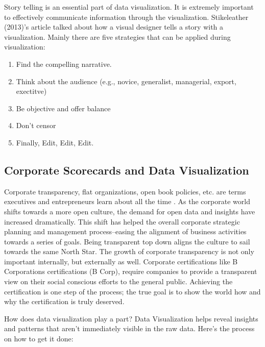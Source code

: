 \documentclass[]{book}
\providecommand{\tightlist}{%
  \setlength{\itemsep}{0pt}\setlength{\parskip}{0pt}}
\theoremstyle{definition}
\theoremstyle{definition}
\theoremstyle{definition}
\theoremstyle{remark}
\begin{document}
Story telling is an essential part of data visualization. It is
extremely important to effectively communicate information through the
visualization. Stikeleather (2013)'s article talked about how a visual
designer tells a story with a visualization. Mainly there are five
strategies that can be applied during visualization:

\begin{enumerate}
\def\labelenumi{\arabic{enumi}.}
\tightlist
\item
  Find the compelling narrative.
\item
  Think about the audience (e.g., novice, generalist, managerial,
  export, exectitve)
\item
  Be objective and offer balance
\item
  Don't censor
\item
  Finally, Edit, Edit, Edit.
\end{enumerate}

\subsection{Corporate Scorecards and Data
Visualization}\label{corporate-scorecards-and-data-visualization}

Corporate transparency, flat organizations, open book policies, etc. are
terms executives and entrepreneurs learn about all the time
\citep{SCORECARDS}. As the corporate world shifts towards a more open
culture, the demand for open data and insights have increased
dramatically. This shift has helped the overall corporate strategic
planning and management process--easing the alignment of business
activities towards a series of goals. Being transparent top down aligns
the culture to sail towards the same North Star. The growth of corporate
transparency is not only important internally, but externally as well.
Corporate certifications like B Corporations certifications (B Corp),
require companies to provide a transparent view on their social
conscious efforts to the general public. Achieving the certification is
one step of the process; the true goal is to show the world how and why
the certification is truly deserved.

How does data visualization play a part? Data Visualization helps reveal
insights and patterns that aren't immediately visible in the raw data.
Here's the process on how to get it done:
\end{document}
